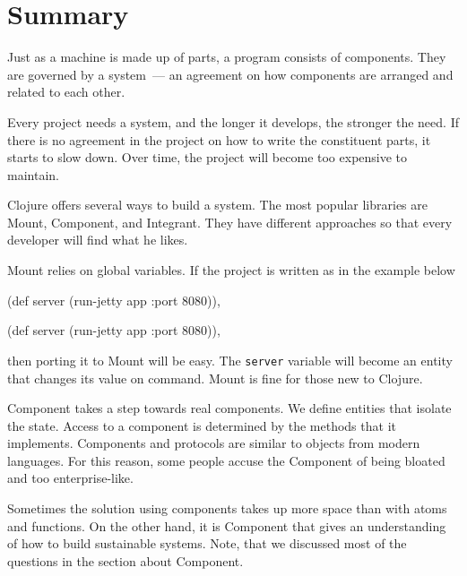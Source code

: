 \section{Summary}

Just as a machine is made up of parts, a program consists of components. They are governed by a system~--- an agreement on how components are arranged and related to each other.

Every project needs a system, and the longer it develops, the stronger the need. If there is no agreement in the project on how to write the constituent parts, it starts to slow down. Over time, the project will become too expensive to maintain.

Clojure offers several ways to build a system. The most popular libraries are Mount, Component, and Integrant. They have different approaches so that every developer will find what he likes.

Mount relies on global variables. If the project is written as in the example
below

\ifnarrow

\begin{english}
  \begin{clojure}
(def server
  (run-jetty app {:port 8080})),
  \end{clojure}
\end{english}

\else

\begin{english}
  \begin{clojure}
(def server (run-jetty app {:port 8080})),
  \end{clojure}
\end{english}

\fi

\noindent
then porting it to Mount will be easy.
The \verb|server| variable will become an entity that changes its value on command. Mount is fine for those new to Clojure.

Component takes a step towards real components. We define entities that isolate the state. Access to a component is determined by the methods that it implements. Components and protocols are similar to objects from modern languages. For this reason, some people accuse the Component of being bloated and too enterprise-like.

Sometimes the solution using components takes up more space than with atoms and functions. On the other hand, it is Component that gives an understanding of how to build sustainable systems. Note, that we discussed most of the questions in the section about Component.

